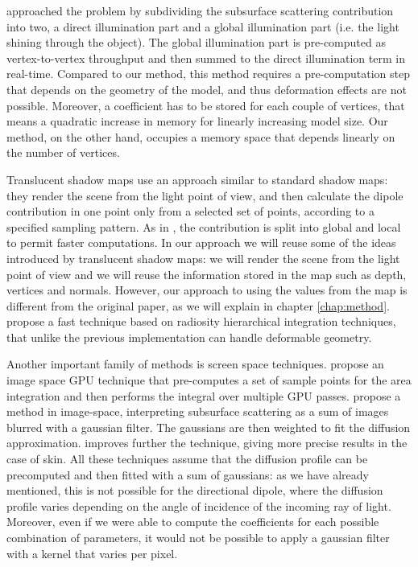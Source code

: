 \cite{Lensch:2002:IRT:826030.826632} approached the problem by subdividing the subsurface scattering contribution into two, a direct illumination part and a global illumination part (i.e. the light shining through the object). The global illumination part is pre-computed as vertex-to-vertex throughput and then summed to the direct illumination term in real-time. Compared to our method, this method requires a pre-computation step that depends on the geometry of the model, and thus deformation effects are not possible. Moreover, a coefficient has to be stored for each couple of vertices, that means a quadratic increase in memory for linearly increasing model size. Our method, on the other hand, occupies a memory space that depends linearly on the number of vertices.

Translucent shadow maps \citep{Dachsbacher:2003:TSM:882404.882433} use an approach similar to standard shadow maps: they render the scene from the light point of view, and then calculate the dipole contribution in one point only from a selected set of points, according to a specified sampling pattern. As in \cite{Lensch:2002:IRT:826030.826632}, the contribution is split into global and local to permit faster computations. In our approach we will reuse some of the ideas introduced by translucent shadow maps: we will render the scene from the light point of view and we will reuse the information stored in the map such as depth, vertices and normals. However, our approach to using the values from the map is different from the original paper, as we will explain in chapter \ref{chap:method}. \cite{Mertens:2003:IRT:882404.882423} propose a fast technique based on radiosity hierarchical integration techniques, that unlike the previous implementation can handle deformable geometry.

Another important family of methods is screen space techniques. \cite{1238246} propose an image space GPU technique that pre-computes a set of sample points for the area integration and then performs the integral over multiple GPU passes. \cite{d'Eon:2007:ERH:2383847.2383869,deonss} propose a method in image-space, interpreting subsurface scattering as a sum of images blurred with a gaussian filter. The gaussians are then weighted to fit the diffusion approximation. \cite{Jimenez:2009:SPR:1609967.1609970} improves further the technique, giving more precise results in the case of skin. All these techniques assume that the diffusion profile can be precomputed and then fitted with a sum of gaussians: as we have already mentioned, this is not possible for the directional dipole, where the diffusion profile varies depending on the angle of incidence of the incoming ray of light. Moreover, even if we were able to compute the coefficients for each possible combination of parameters, it would not be possible to apply a gaussian filter with a kernel that varies per pixel.

